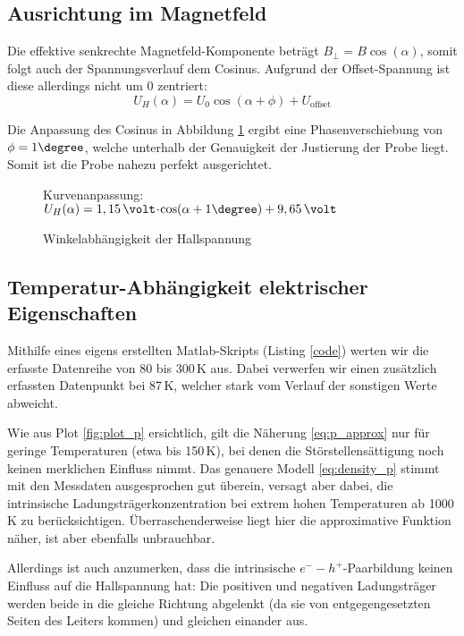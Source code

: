 \subsection{Ausrichtung im Magnetfeld}
Die effektive senkrechte Magnetfeld-Komponente beträgt $B_\perp = B \cos (\alpha)$, somit folgt auch der Spannungsverlauf dem Cosinus. Aufgrund der Offset-Spannung ist diese allerdings nicht um 0 zentriert:
\begin{equation}
U_H(\alpha) = U_0 \cos (\alpha + \phi) + U_\text{offset}
\end{equation}

Die Anpassung des Cosinus in Abbildung \ref{fig:plot_alpha} ergibt eine Phasenverschiebung von $\phi = 1\degree$, welche unterhalb der Genauigkeit der Justierung der Probe liegt. Somit ist die Probe nahezu perfekt ausgerichtet.

\begin{figure}[p]
\centering

\caption{Winkelabhängigkeit der Hallspannung}
\label{fig:plot_alpha}
\vspace{-0.5ex}
Kurvenanpassung: $U_H(\alpha) = 1,15 \,\volt \cdt \cos (\alpha + 1\degree) + 9,65\,\volt$
\vspace{-7em}
\end{figure}

\newpage
\subsection{Temperatur-Abhängigkeit elektrischer Eigenschaften} 
Mithilfe eines eigens erstellten Matlab-Skripts (Listing \ref{code}) werten wir die erfasste Datenreihe von 80 bis 300\,K aus. Dabei verwerfen wir einen zusätzlich erfassten Datenpunkt bei 87\,K, welcher stark vom Verlauf der sonstigen Werte abweicht.

Wie aus Plot \ref{fig:plot_p} ersichtlich, gilt die Näherung \eqref{eq:p_approx} nur für geringe Temperaturen (etwa bis 150\,K), bei denen die Störstellensättigung noch keinen merklichen Einfluss nimmt. Das genauere Modell \eqref{eq:density_p} stimmt mit den Messdaten ausgesprochen gut überein, versagt aber dabei, die intrinsische Ladungsträgerkonzentration bei extrem hohen Temperaturen ab 1000\,K zu berücksichtigen.
Überraschenderweise liegt hier die approximative Funktion näher, ist aber ebenfalls unbrauchbar.

Allerdings ist auch anzumerken, dass die intrinsische $e^- - h^+$-Paarbildung keinen Einfluss auf die Hallspannung hat: Die positiven und negativen Ladungsträger werden beide in die gleiche Richtung abgelenkt (da sie von entgegengesetzten Seiten des Leiters kommen) und gleichen einander aus.

